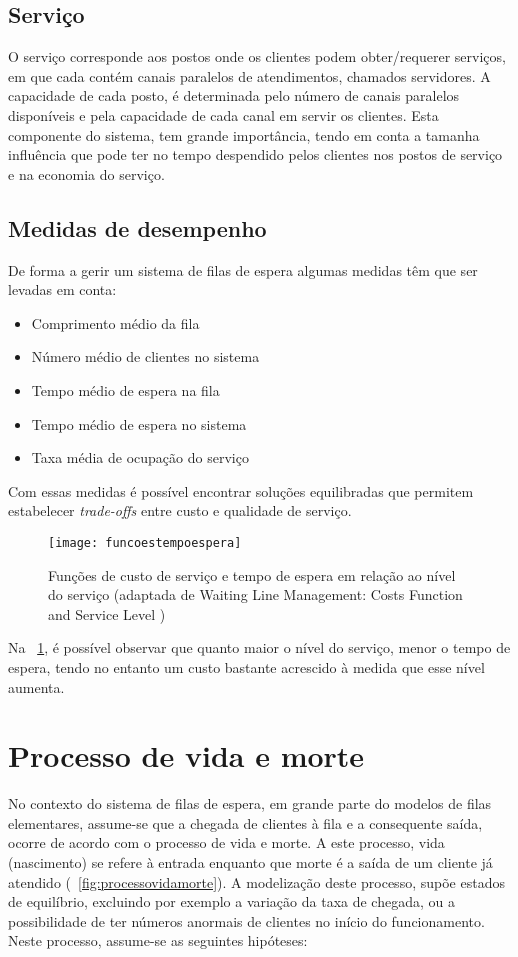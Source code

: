 \subsection{Serviço} 
O serviço corresponde aos postos onde os clientes podem obter/requerer serviços, em que cada contém canais paralelos de atendimentos, chamados servidores. A capacidade de cada posto, é determinada pelo número de canais paralelos disponíveis e pela capacidade de cada canal em servir os clientes. Esta componente do sistema, tem grande importância, tendo em conta a tamanha influência que pode ter no tempo despendido pelos clientes nos postos de serviço e na economia do serviço.


\subsection{Medidas de desempenho}

De forma a gerir um sistema de filas de espera algumas medidas têm que ser levadas em conta:

\begin{itemize}
\item Comprimento médio da fila
\item Número médio de clientes no sistema
\item Tempo médio de espera na fila
\item Tempo médio de espera no sistema
\item Taxa média de ocupação do serviço
\end{itemize}

Com essas medidas é possível encontrar soluções equilibradas que permitem estabelecer \textit{trade-offs} entre custo e qualidade de serviço.

\begin{figure}[ht]
    \centering
    \texttt{[image: funcoestempoespera]}
      \caption{Funções de custo de serviço e tempo de espera em relação ao nível do serviço (adaptada de Waiting Line Management: Costs Function and Service Level \cite{wlm})}
  \label{fig:funcoestempoespera}
\end{figure}

Na \figurename~\ref{fig:funcoestempoespera}, é possível observar que quanto maior o nível do serviço, menor o tempo de espera, tendo no entanto um custo bastante acrescido à medida que esse nível aumenta.


\section{Processo de vida e morte}
No contexto do sistema de filas de espera, em grande parte do modelos de filas elementares, assume-se que a chegada de clientes à fila e a consequente saída, ocorre de acordo com o processo de vida e morte. A este processo, vida (nascimento) se refere à entrada enquanto que morte é a saída de um cliente já atendido (\figurename~\ref{fig:processovidamorte}). A modelização deste processo, supõe estados de equilíbrio, excluindo por exemplo a variação da taxa de chegada, ou a possibilidade de ter números anormais de clientes no início do funcionamento. Neste processo, assume-se as seguintes hipóteses:


